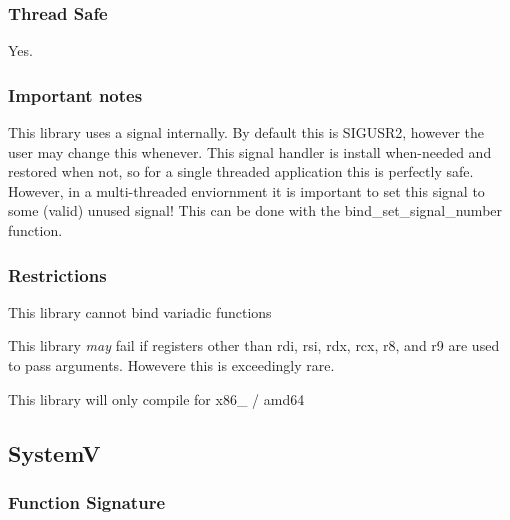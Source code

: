 \subsubsection*{Thread Safe}

Yes.

\subsubsection*{Important notes}


\begin{DoxyEnumerate}
\item This library uses a signal internally. By default this is {\ttfamily S\+I\+G\+U\+S\+R2}, however the user may change this whenever. This signal handler is install when-\/needed and restored when not, so for a single threaded application this is perfectly safe. However, in a multi-\/threaded enviornment it is important to set this signal to some (valid) unused signal! This can be done with the {\ttfamily bind\+\_\+set\+\_\+signal\+\_\+number} function.
\end{DoxyEnumerate}

\subsubsection*{Restrictions}


\begin{DoxyEnumerate}
\item This library cannot bind variadic functions
\end{DoxyEnumerate}
\begin{DoxyEnumerate}
\item This library {\itshape may} fail if registers other than {\ttfamily rdi}, {\ttfamily rsi,} {\ttfamily rdx}, {\ttfamily rcx}, {\ttfamily r8}, and {\ttfamily r9} are used to pass arguments. Howevere this is exceedingly rare.
\end{DoxyEnumerate}
\begin{DoxyEnumerate}
\item This library will only compile for {\ttfamily x86\+\_} / {\ttfamily amd64}
\end{DoxyEnumerate}

\subsection*{SystemV}

\subsubsection*{Function Signature}

